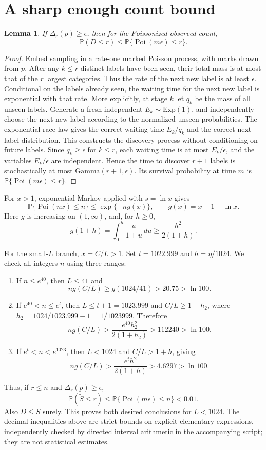 \documentclass[11pt]{article}
\newtheorem{lemma}{Lemma}
\newcommand{\Prb}{\mathbb P}
\newcommand{\Poi}{\operatorname{Poi}}
\begin{document}
\section{A sharp enough count bound}
\begin{lemma}
If $\Delta_r(p)\ge\epsilon$, then for the Poissonized observed count,
\[
 \Prb(D\le r)\le\Prb\{\Poi(m\epsilon)\le r\}.
\]
\end{lemma}
\begin{proof}
Embed sampling in a rate-one marked Poisson process, with marks drawn from
$p$. After any $k\le r$ distinct labels have been seen, their total mass is
at most that of the $r$ largest categories. Thus the rate of the next new
label is at least $\epsilon$. Conditional on the labels already seen, the
waiting time for the next new label is exponential with that rate.
More explicitly, at stage $k$ let $q_k$ be the mass of all unseen labels.
Generate a fresh independent $E_k\sim\mathrm{Exp}(1)$, and independently
choose the next new label according to the normalized unseen probabilities.
The exponential-race law gives the correct waiting time $E_k/q_k$ and the
correct next-label distribution. This constructs the discovery process
without conditioning on future labels. Since $q_k\ge\epsilon$ for $k\le r$,
each waiting time is at most $E_k/\epsilon$, and the variables
$E_k/\epsilon$ are independent. Hence the time to discover $r+1$ labels is stochastically
at most $\mathrm{Gamma}(r+1,\epsilon)$. Its survival probability at time $m$
is $\Prb\{\Poi(m\epsilon)\le r\}$.
\end{proof}

For $x>1$, exponential Markov applied with $s=\ln x$ gives
\begin{equation}
 \Prb\{\Poi(nx)\le n\}
 \le \exp\{-n g(x)\},\qquad g(x)=x-1-\ln x.
 \label{eq:chernoff}
\end{equation}
Here $g$ is increasing on $(1,\infty)$, and, for $h\ge0$,
\begin{equation}
 g(1+h)=\int_0^h\frac{u}{1+u}\,du
 \ge\frac{h^2}{2(1+h)}.\label{eq:g}
\end{equation}

For the small-$L$ branch, $x=C/L>1$. Set $t=1022.999$ and
$h=\eta/1024$. We check all integers $n$ using three ranges:
\begin{enumerate}
\item If $n\le e^{40}$, then $L\le41$ and
\[
 ng(C/L)\ge g(1024/41)>20.75>\ln100.
\]
\item If $e^{40}<n\le e^t$, then $L\le t+1=1023.999$ and
$C/L\ge1+h_2$, where $h_2=1024/1023.999-1=1/1023999$. Therefore
\[
 ng(C/L)>\frac{e^{40}h_2^2}{2(1+h_2)}>112240>\ln100.
\]
\item If $e^t<n<e^{1023}$, then $L<1024$ and $C/L>1+h$, giving
\[
 ng(C/L)>\frac{e^t h^2}{2(1+h)}>4.6297>\ln100.
\]
\end{enumerate}
Thus, if $r\le n$ and $\Delta_r(p)\ge\epsilon$,
\[
 \Prb(\widetilde S\le r)\le\Prb\{\Poi(m\epsilon)\le n\}<0.01.
\]
Also $D\le S$ surely. This proves both desired conclusions for $L<1024$.
The decimal inequalities above are strict bounds on explicit elementary
expressions, independently checked by directed interval arithmetic in the
accompanying script; they are not statistical estimates.
\end{document}
